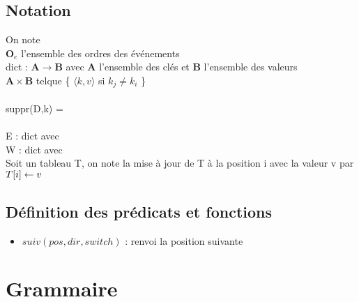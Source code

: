 \documentclass[12pt]{article}
\begin{document}
\subsection{Notation}
On note
\\
$\mathbf{O}_{e}$ l'ensemble des ordres des événements
\vspace{0.3cm} \\
dict : $\mathbf{A} \rightarrow \mathbf{B}$ avec $\mathbf{A}$ l'ensemble des clés et $\mathbf{B}$ l'ensemble des valeurs
\\ $\mathbf{A} \times \mathbf{B}$ telque \{ $\langle k,v \rangle$ si $k_{j} \neq k_{i}$ \} \\
\vspace{0.1cm} \\
suppr(D,k) = 
\\
\vspace{0.3cm} \\
E : dict avec 
\vspace{0.3cm} \\
W : dict avec 
\vspace{0.3cm} \\
Soit un tableau T, on note la mise à jour de T à la position i avec la valeur v par $T[i] \gets v$ 

\subsection{Définition des prédicats et fonctions}

\begin{itemize}
    \item $suiv(pos, dir, switch)$ : renvoi la position suivante 
\end{itemize}


\section{Grammaire}



\begin{grammar}
    \otherform{\varepsilon }{}
\end{grammar}
\end{document}
